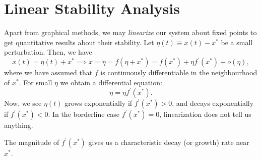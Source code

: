 \documentclass[oneside]{book}
\begin{document}
\section{Linear Stability Analysis}
Apart from graphical methods, we may \textit{linearize} our system about fixed points to get quantitative results about their stability. Let $ \eta(t) \equiv x(t) - x^* $ be a small perturbation. Then, we have
\[
x(t) = \eta(t) + x^* \implies \dot{x} = \dot{\eta} = f(\eta + x^*) = f(x^*) + \eta f^\prime(x^*) + o(\eta),
\]
where we have assumed that $ f $ is continuously differentiable in the neighbourhood of $ x^* $. For small $ \eta $ we obtain a differential equation:
\begin{equation} \label{eq:231}
	\dot{\eta} = \eta f^\prime (x^*).
\end{equation}
Now, we see $ \eta(t) $ grows exponentially if $ f^\prime(x^*) > 0 $, and decays exponentially if $ f^\prime(x^*) < 0 $. In the borderline case $ f^\prime(x^*) = 0 $, linearization does not tell us anything.
\par
The magnitude of $ f^\prime(x^*) $ gives us a characteristic decay (or growth) rate near $ x^* $.
\\\\
\end{document}
